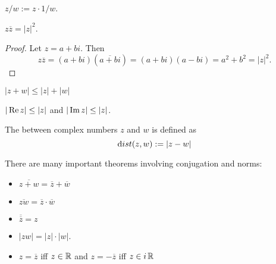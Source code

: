 \begin{definition}
    $z/w := z \cdot 1/w$.
\end{definition}

\begin{theorem}
    $z\overline{z} = |z|^2$.
\end{theorem}
\begin{proof}
    Let $z = a+bi$.  Then
    \[ z\overline{z} = (a+bi)(\overline{a+bi}) = (a+bi)(a-bi)
    = a^2 + b^2 = |z|^2. \]
\end{proof}

\begin{theorem}
$    |z + w| \le |z| + |w|$
\end{theorem}

\begin{cor}
    $|\operatorname{Re}{z}| \le |z|$ and $|\operatorname{Im}{z}| \le |z|$.
\end{cor}

\begin{definition}
    The  between complex numbers $z$ and $w$ is defined as
    \[ {\text dist}(z,w) := |z - w| \]
\end{definition}

\noindent
There are many important theorems involving conjugation and norms:
\begin{itemize}
    \item $\overline{z+w} = \overline{z} + \overline{w}$

    \item $\overline{zw} = \overline{z} \cdot \overline{w}$

    \item $\overline{\overline{z}} = z$

    \item $|zw| = |z| \cdot |w|$.

    \item $z = \overline{z}$ iff $z \in \operatorname{\mathbb{R}}$ and $z = -\overline{z}$ iff $z \in i\operatorname{\mathbb{R}}$
\end{itemize}




%

